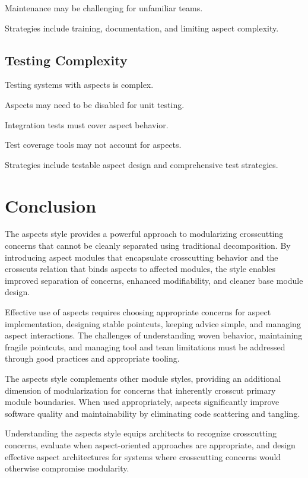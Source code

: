 \documentclass[11pt]{article}
\begin{document}
Maintenance may be challenging for unfamiliar teams.

Strategies include training, documentation, and limiting aspect complexity.

\subsection{Testing Complexity}

Testing systems with aspects is complex.

Aspects may need to be disabled for unit testing.

Integration tests must cover aspect behavior.

Test coverage tools may not account for aspects.

Strategies include testable aspect design and comprehensive test strategies.

\section{Conclusion}

The aspects style provides a powerful approach to modularizing crosscutting concerns that cannot be cleanly separated using traditional decomposition. By introducing aspect modules that encapsulate crosscutting behavior and the crosscuts relation that binds aspects to affected modules, the style enables improved separation of concerns, enhanced modifiability, and cleaner base module design.

Effective use of aspects requires choosing appropriate concerns for aspect implementation, designing stable pointcuts, keeping advice simple, and managing aspect interactions. The challenges of understanding woven behavior, maintaining fragile pointcuts, and managing tool and team limitations must be addressed through good practices and appropriate tooling.

The aspects style complements other module styles, providing an additional dimension of modularization for concerns that inherently crosscut primary module boundaries. When used appropriately, aspects significantly improve software quality and maintainability by eliminating code scattering and tangling.

Understanding the aspects style equips architects to recognize crosscutting concerns, evaluate when aspect-oriented approaches are appropriate, and design effective aspect architectures for systems where crosscutting concerns would otherwise compromise modularity.
\end{document}
